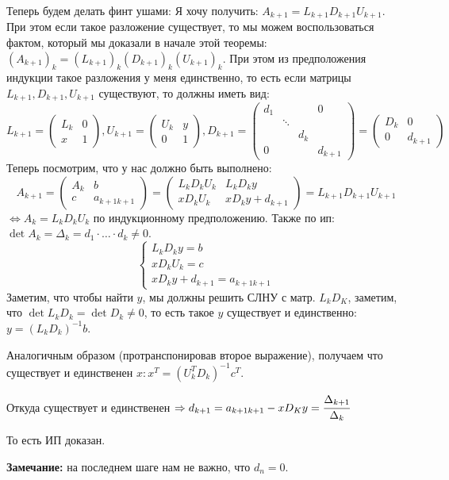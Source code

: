 \begin{enumerate}
        Теперь будем делать финт ушами: Я хочу получить: $A_{k+1} = L_{k+1}D_{k+1}U_{k+1}$. При этом если такое разложение существует, то мы можем воспользоваться фактом, который мы доказали в начале этой теоремы: $(A_{k+1})_k = (L_{k+1})_k(D_{k+1})_k (U_{k+1})_k$. При этом из предположения индукции такое разложения у меня единственно, то есть если матрицы $L_{k+1}, D_{k+1}, U_{k+1}$ существуют, то должны иметь вид:
        $$L_{k+1} = \begin{pmatrix}
            L_k & 0\\
            x & 1
        \end{pmatrix}, U_{k+1} = \begin{pmatrix}
            U_k & y\\
            0 & 1
        \end{pmatrix}, D_{k+1} = \begin{pmatrix}
            d_1 &  &  & 0\\
             &  \ddots &  &\\
             &  & d_{k} &\\
             0 & & & d_{k+1}
         \end{pmatrix} = \begin{pmatrix}
             D_k & 0\\
             0 & d_{k+1}
         \end{pmatrix}$$
         Теперь посмотрим, что у нас должно быть выполнено:
         $$A_{k+1} = \begin{pmatrix}
             A_k & b \\
             c & a_{k+1 k+1}
         \end{pmatrix} = \begin{pmatrix}
             L_kD_kU_k & L_kD_ky\\
             x D_k U_k & x D_ky + d_{k+1}
         \end{pmatrix} = L_{k+1}D_{k+1}U_{k+1}$$
         $\Leftrightarrow A_k = L_k D_k U_k$ по индукционному предположению. Также по ип: $\det A_k = \Delta_k = d_1\cdot \ldots \cdot d_k \neq 0$.
        $$\begin{cases}
            L_kD_k y =b\\
            x D_k U_k = c\\
            x D_k y + d_{k+1} = a_{k+1 k+1}
        \end{cases}$$
        Заметим, что чтобы найти $y$, мы должны решить СЛНУ с матр. $L_k D_K$, заметим, что $\det L_k D_k = \det D_k\neq 0$, то есть такое $y$ существует и единственно: $y = (L_k D_k)^{-1}b$.

        Аналогичным образом (протранспонировав второе выражение), получаем что существует и единственен $x: x^T = (U_k^T D_k)^{-1}c^T$.

        Откуда существует и единственен $\Rightarrow d_{k+1} = a_{k+1 k+1} -xD_Ky = \cfrac{\Delta_{k+1}}{\Delta_k}$

         То есть ИП доказан.

         \textbf{Замечание:} на последнем шаге нам не важно, что $d_n=0$.

    \end{enumerate}



